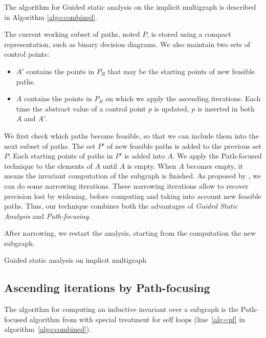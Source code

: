 \documentclass[preprint]{sigplanconf}
\begin{document}
The algorithm for Guided static analysis on the implicit multigraph is described
in Algorithm \ref{algo:combined}.

The current working subset of paths, noted $P$, is stored using a
compact representation, such as binary decision diagrams.
We also maintain two sets of control points:
\begin{itemize}
	\item $A'$ contains the points in $P_R$ that may be the starting points of new
		feasible paths.
	\item $A$ contains the points in $P_R$ on which we apply the ascending iterations.
	Each time the abstract value of a control point $p$ is updated, $p$ is
	inserted in both $A$ and $A'$.
\end{itemize}

We first check which paths become feasible, so that we can include them into the
next subset of paths. The set $P'$ of new feasible paths is added to the
previous set $P$. Each starting points of paths in $P'$ is added into $A$.
We apply the Path-focused technique\cite{Monniaux_Gonnord_SAS11} to
the elements of $A$ until $A$ is empty. 
When $A$ becomes empty, it means the
invariant computation of the subgraph is finished. As proposed by
\citet{DBLP:conf/sas/GopanR07}, we can do some narrowing iterations.
These narrowing iterations allow to recover precision lost by
widening, before computing and taking into account new feasible paths.
Thus, our technique combines both the advantages of \emph{Guided Static
Analysis} and \emph{Path-focusing}.

After narrowing, we restart the analysis, starting from the computation the new
subgraph.

\begin{algorithm}
	\caption{Guided static analysis on implicit multigraph}
	\label{algo:combined}
	\begin{algorithmic}[1] 
	
	\end{algorithmic}
\end{algorithm}


\subsection{Ascending iterations by Path-focusing}
\label{subsec:ascending}

The algorithm for computing an inductive invariant over a subgraph is the
Path-focused algorithm from \citet{Monniaux_Gonnord_SAS11} with special
treatment for self loops (line~\ref{alg=pf} in algorithm~\ref{algo:combined}).
\end{document}
